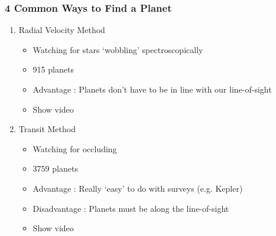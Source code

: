 \documentclass{beamer}
\begin{document}
\begin{frame}
\frametitle{4 Common Ways to Find a Planet}
\begin{enumerate}
    \item Radial Velocity Method
        \pause
        \begin{itemize}
            \item Watching for stars `wobbling' spectroscopically
            \pause
            \item 915 planets
            \pause
            \item Advantage : Planets don't have to be in line with our line-of-sight
            \pause
            \item Show video
        \end{itemize}
    \pause
    \item Transit Method
        \pause
        \begin{itemize}
            \item Watching for occluding 
            \pause
            \item 3759 planets
            \pause
            \item Advantage : Really `easy' to do with surveys (e.g. Kepler)
            \pause
            \item Disadvantage : Planets must be along the line-of-sight
            \pause
            \item Show video
        \end{itemize}
\end{enumerate}
\end{frame}
\end{document}
